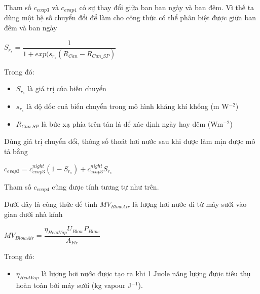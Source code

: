 \documentclass[a4paper]{article}
\begin{document}
    Tham số $c_{evap3}$ và $c_{evap4}$ có sự thay đổi giữa ban ban ngày và ban đêm. Vì thế ta dùng một hệ số chuyển đổi để làm cho công thức có thể phân biệt được giữa ban đêm và ban ngày
    \begin{center}
        $S_{r_s} = \dfrac{1}{1 + exp(s_{r_s}(R_{Can} - R_{Can\_SP})}$
    \end{center}
    Trong đó:
    \begin{itemize}
        \item $S_{r_s}$ là giá trị của biến chuyển
        \item $s_{r_s}$ là độ dốc cuả biến chuyển trong mô hình kháng khí khổng
        (m W$^{-2}$) 
        \item $R_{Can\_SP}$ là bức xạ phía trên tán lá để xác định ngày hay đêm (Wm$^{-2}$)
    \end{itemize}
    Dùng giá trị chuyển đổi, thông số thoát hơi nước sau khi được làm mịn được mô tả bằng
    \begin{center}
        $c_{evap3} = c^{night}_{evap3}(1 - S_{r_s}) + c^{night}_{evap3}S_{r_s}$
    \end{center}
    Tham số $c_{evap4}$ cũng được tính tương tự như trên.
    
    \vpsace{5mm}
    
    Dưới đây là công thức để tính $MV_{BlowAir}$ là lượng hơi nước đi từ máy sưởi vào gian dưới nhà kính
    \begin{center}
        $MV_{BlowAir} = \dfrac{\eta_{HeatVap}U_{Blow}P_{Blow}}{A_{Flr}}$
    \end{center}
    Trong đó:
    \begin{itemize}
        \item $\eta_{HeatVap}$ là lượng hơi nước được tạo ra khi 1 Juole năng lượng được tiêu thụ hoàn toàn bởi máy sưởi (kg vapour J$^{-1}$).
    \end{itemize}
    
    \vspace{5mm}
    
\end{document}
